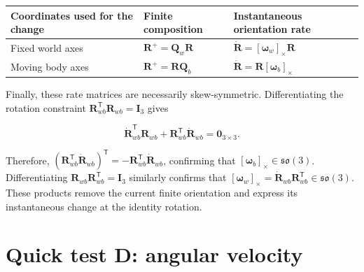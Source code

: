 \documentclass[
  australian,
  12pt,
  letterpaper,
  DIV=11,
  numbers=noendperiod,
  twoside]{scrreprt}
\newcounter{none} %
\begin{document}
{\def\LTcaptype{none} %
\begin{longtable}[]{@{}
  >{\raggedright\arraybackslash}p{}
  >{\raggedright\arraybackslash}p{}
  >{\raggedright\arraybackslash}p{}@{}}
\toprule\noalign{}
\begin{minipage}[b]{\linewidth}\raggedright
Coordinates used for the change
\end{minipage} & \begin{minipage}[b]{\linewidth}\raggedright
Finite composition
\end{minipage} & \begin{minipage}[b]{\linewidth}\raggedright
Instantaneous orientation rate
\end{minipage} \\
\midrule\noalign{}
\endhead
\bottomrule\noalign{}
\endlastfoot
Fixed world axes & \(\mathbf R^+=\mathbf Q_w\mathbf R\) &
\(\dot{\mathbf R}=[\boldsymbol\omega_w]_\times\mathbf R\) \\
Moving body axes & \(\mathbf R^+=\mathbf R\mathbf Q_b\) &
\(\dot{\mathbf R}=\mathbf R[\boldsymbol\omega_b]_\times\) \\
\end{longtable}
}

Finally, these rate matrices are necessarily skew-symmetric.
Differentiating the rotation constraint
\(\mathbf R_{wb}^\mathsf T\mathbf R_{wb}=\mathbf I_3\) gives

\[
\dot{\mathbf R}_{wb}^\mathsf T\mathbf R_{wb}
+
\mathbf R_{wb}^\mathsf T\dot{\mathbf R}_{wb}
=
\mathbf 0_{3\times3}.
\]

Therefore,
\((\mathbf R_{wb}^\mathsf T\dot{\mathbf R}_{wb})^\mathsf T=-\mathbf R_{wb}^\mathsf T\dot{\mathbf R}_{wb}\),
confirming that \([\boldsymbol\omega_b]_\times\in\mathfrak{so}(3)\).
Differentiating \(\mathbf R_{wb}\mathbf R_{wb}^\mathsf T=\mathbf I_3\)
similarly confirms that
\([\boldsymbol\omega_w]_\times=\dot{\mathbf R}_{wb}\mathbf R_{wb}^\mathsf T\in\mathfrak{so}(3)\).
These products remove the current finite orientation and express its
instantaneous change at the identity rotation.

\section*{Quick test D: angular
velocity}\label{quick-test-d-angular-velocity}
\end{document}
